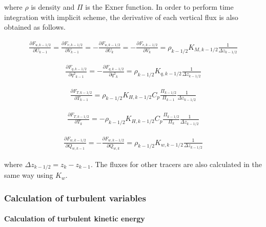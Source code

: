 where \(\rho\) is density and \(\Pi\) is the Exner function. In order to
perform time integration with implicit scheme, the derivative of each
vertical flux is also obtained as follows.

\begin{eqnarray}\frac{\partial F_{u,k-1/2}}{\partial U_{k-1}}=\frac{\partial F_{v,k-1/2}}{\partial V_{k-1}}=-\frac{\partial F_{u,k-1/2}}{\partial U_{k}}=-\frac{\partial F_{v,k-1/2}}{\partial V_{k}}=\rho_{k-1/2}K_{M,k-1/2}\frac{1}{\Delta z_{k-1/2}}\end{eqnarray}

\begin{eqnarray}\frac{\partial F_{q,k-1/2}}{\partial {q^2}_ {k-1}}=-\frac{\partial F_{q,k-1/2}}{\partial {q^2}_ {k}}=\rho_{k-1/2}K_{q,k-1/2}\frac{1}{\Delta z_{k-1/2}}\end{eqnarray}

\begin{eqnarray}\frac{\partial F_{T,k-1/2}}{\partial T_{k-1}}=\rho_{k-1/2}K_{H,k-1/2}C_p\frac{\Pi_{k-1/2}}{\Pi_{k-1}}\frac{1}{\Delta z_{k-1/2}}\end{eqnarray}

\begin{eqnarray}\frac{\partial F_{T,k-1/2}}{\partial T_{k}}=-\rho_{k-1/2}K_{H,k-1/2}C_p\frac{\Pi_{k-1/2}}{\Pi_{k}}\frac{1}{\Delta z_{k-1/2}}\end{eqnarray}

\begin{eqnarray}\frac{\partial F_{w,k-1/2}}{\partial Q_{w,k-1}}=-\frac{\partial F_{w,k-1/2}}{\partial Q_{w,k}}=\rho_{k-1/2}K_{w,k-1/2}\frac{1}{\Delta z_{k-1/2}}\end{eqnarray}

where \(\Delta z_{k-1/2}=z_k-z_{k-1}\). The fluxes for other tracers are
also calculated in the same way using \(K_w\).

\hypertarget{calculation-of-turbulent-variables}{%
\subsubsection{Calculation of turbulent
variables}\label{calculation-of-turbulent-variables}}

\hypertarget{calculation-of-turbulent-kinetic-energy}{%
\paragraph{Calculation of turbulent kinetic
energy}\label{calculation-of-turbulent-kinetic-energy}}

